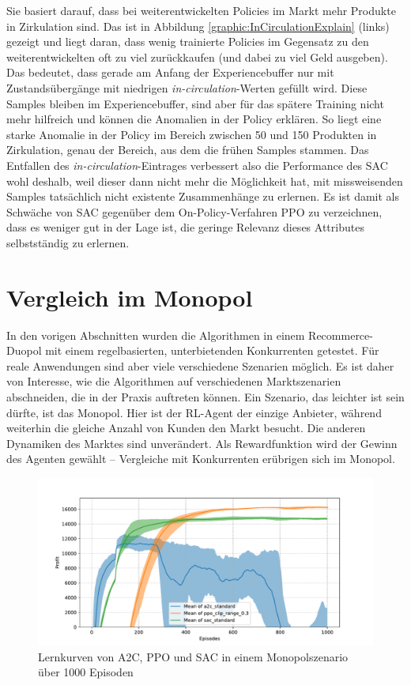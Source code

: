 Sie basiert darauf, dass bei weiterentwickelten Policies im Markt mehr Produkte in Zirkulation sind.
Das ist in Abbildung \ref{graphic:InCirculationExplain} (links) gezeigt und liegt daran, dass wenig trainierte Policies im Gegensatz zu den weiterentwickelten oft zu viel zurückkaufen (und dabei zu viel Geld ausgeben).
Das bedeutet, dass gerade am Anfang der Experiencebuffer nur mit Zustandsübergänge mit niedrigen \textit{in-circulation}-Werten gefüllt wird.
Diese Samples bleiben im Experiencebuffer, sind aber für das spätere Training nicht mehr hilfreich und können die Anomalien in der Policy erklären.
So liegt eine starke Anomalie in der Policy im Bereich zwischen 50 und 150 Produkten in Zirkulation, genau der Bereich, aus dem die frühen Samples stammen.
Das Entfallen des \textit{in-circulation}-Eintrages verbessert also die Performance des SAC wohl deshalb, weil dieser dann nicht mehr die Möglichkeit hat, mit missweisenden Samples tatsächlich nicht existente Zusammenhänge zu erlernen.
Es ist damit als Schwäche von SAC gegenüber dem On-Policy-Verfahren PPO zu verzeichnen, dass es weniger gut in der Lage ist, die geringe Relevanz dieses Attributes selbstständig zu erlernen.

\section{Vergleich im Monopol}
In den vorigen Abschnitten wurden die Algorithmen in einem Recommerce-Duopol mit einem regelbasierten, unterbietenden Konkurrenten getestet.
Für reale Anwendungen sind aber viele verschiedene Szenarien möglich.
Es ist daher von Interesse, wie die Algorithmen auf verschiedenen Marktszenarien abschneiden, die in der Praxis auftreten können.
Ein Szenario, das leichter ist sein dürfte, ist das Monopol.
Hier ist der RL-Agent der einzige Anbieter, während weiterhin die gleiche Anzahl von Kunden den Markt besucht.
Die anderen Dynamiken des Marktes sind unverändert.
Als Rewardfunktion wird der Gewinn des Agenten gewählt -- Vergleiche mit Konkurrenten erübrigen sich im Monopol.

\begin{figure}[htbp]
	\centering
	\includegraphics[width=\textwidth]{main/comparison_monopoly.pdf}
	\caption{Lernkurven von A2C, PPO und SAC in einem Monopolszenario über 1000 Episoden}
	\label{graphic:MonopolyComparison}
\end{figure}

